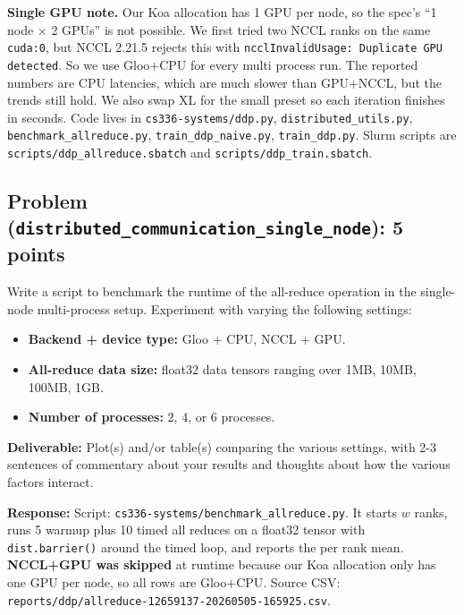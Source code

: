 \documentclass[11pt]{article}
\begin{document}
\noindent\textbf{Single GPU note.} Our Koa allocation has 1 GPU per node, so the spec's ``1 node $\times$ 2 GPUs'' is not possible. We first tried two NCCL ranks on the same \verb|cuda:0|, but NCCL 2.21.5 rejects this with \verb|ncclInvalidUsage: Duplicate GPU detected|. So we use Gloo+CPU for every multi process run. The reported numbers are CPU latencies, which are much slower than GPU+NCCL, but the trends still hold. We also swap XL for the small preset so each iteration finishes in seconds. Code lives in \verb|cs336-systems/ddp.py|, \verb|distributed_utils.py|, \verb|benchmark_allreduce.py|, \verb|train_ddp_naive.py|, \verb|train_ddp.py|. Slurm scripts are \verb|scripts/ddp_allreduce.sbatch| and \verb|scripts/ddp_train.sbatch|.

\subsection*{Problem (\texttt{distributed\_communication\_single\_node}): 5 points}

Write a script to benchmark the runtime of the all-reduce operation in the single-node multi-process setup. Experiment with varying the following settings:
\begin{itemize}
    \item \textbf{Backend + device type:} Gloo + CPU, NCCL + GPU.
    \item \textbf{All-reduce data size:} float32 data tensors ranging over 1MB, 10MB, 100MB, 1GB.
    \item \textbf{Number of processes:} 2, 4, or 6 processes.
\end{itemize}

\textbf{Deliverable:} Plot(s) and/or table(s) comparing the various settings, with 2-3 sentences of commentary about your results and thoughts about how the various factors interact.

\textbf{Response:}
Script: \verb|cs336-systems/benchmark_allreduce.py|. It starts $w$ ranks, runs 5 warmup plus 10 timed all reduces on a float32 tensor with \verb|dist.barrier()| around the timed loop, and reports the per rank mean. \textbf{NCCL+GPU was skipped} at runtime because our Koa allocation only has one GPU per node, so all rows are Gloo+CPU. Source CSV: \verb|reports/ddp/allreduce-12659137-20260505-165925.csv|.
\end{document}
